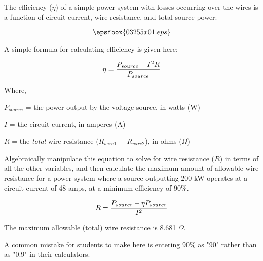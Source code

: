 

The efficiency ($\eta$) of a simple power system with losses occurring over the wires is a function of circuit current, wire resistance, and total source power:

$$\epsfbox{03255x01.eps}$$

A simple formula for calculating efficiency is given here:

$$\eta = {{P_{source} - I^2R} \over P_{source}}$$

\noindent
Where,

$P_{source}$ = the power output by the voltage source, in watts (W)

$I$ = the circuit current, in amperes (A)

$R$ = the {\it total} wire resistance ($R_{wire1}$ + $R_{wire2}$), in ohms ($\Omega$)

\vskip 10pt

Algebraically manipulate this equation to solve for wire resistance ($R$) in terms of all the other variables, and then calculate the maximum amount of allowable wire resistance for a power system where a source outputting 200 kW operates at a circuit current of 48 amps, at a minimum efficiency of 90\%.







$$R = {{P_{source} - \eta P_{source}} \over I^2}$$

The maximum allowable (total) wire resistance is 8.681 $\Omega$.







A common mistake for students to make here is entering 90\% as "90" rather than as "0.9" in their calculators.




